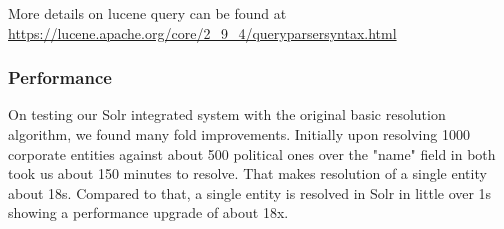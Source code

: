     More details on lucene query can be found at \url{https://lucene.apache.org/core/2\_9\_4/queryparsersyntax.html}
\subsubsection{Performance}
    On testing our Solr integrated system with the original basic resolution algorithm, we found many fold improvements. Initially upon resolving 1000 corporate entities against about 500 political ones over the "name" field in both took us about 150 minutes to resolve. That makes resolution of a single entity about 18s.
    Compared to that, a single entity is resolved in Solr in little over 1s showing a performance upgrade of about 18x.

